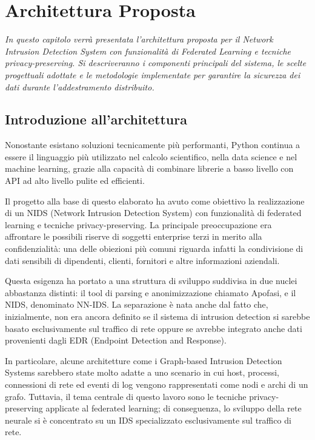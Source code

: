 \chapter{Architettura Proposta} %

\begin{preamble}
{\em In questo capitolo verrà presentata l'architettura proposta per il Network Intrusion Detection System con funzionalità di Federated Learning e tecniche privacy-preserving. Si descriveranno i componenti principali del sistema, le scelte progettuali adottate e le metodologie implementate per garantire la sicurezza dei dati durante l'addestramento distribuito.}
\end{preamble}

\section{Introduzione all'architettura}

Nonostante esistano soluzioni tecnicamente più performanti, Python continua a essere il linguaggio più utilizzato nel calcolo scientifico, nella data science e nel machine learning, grazie alla capacità di combinare librerie a basso livello con API ad alto livello pulite ed efficienti.

Il progetto alla base di questo elaborato ha avuto come obiettivo la realizzazione di un NIDS (Network Intrusion Detection System) con funzionalità di federated learning e tecniche privacy-preserving. La principale preoccupazione era affrontare le possibili riserve di soggetti enterprise terzi in merito alla confidenzialità: una delle obiezioni più comuni riguarda infatti la condivisione di dati sensibili di dipendenti, clienti, fornitori e altre informazioni aziendali.

Questa esigenza ha portato a una struttura di sviluppo suddivisa in due nuclei abbastanza distinti: il tool di parsing e anonimizzazione chiamato Apofasi, e il NIDS, denominato NN-IDS. La separazione è nata anche dal fatto che, inizialmente, non era ancora definito se il sistema di intrusion detection si sarebbe basato esclusivamente sul traffico di rete oppure se avrebbe integrato anche dati provenienti dagli EDR (Endpoint Detection and Response).

In particolare, alcune architetture come i Graph-based Intrusion Detection Systems sarebbero state molto adatte a uno scenario in cui host, processi, connessioni di rete ed eventi di log vengono rappresentati come nodi e archi di un grafo. Tuttavia, il tema centrale di questo lavoro sono le tecniche privacy-preserving applicate al federated learning; di conseguenza, lo sviluppo della rete neurale si è concentrato su un IDS specializzato esclusivamente sul traffico di rete.

